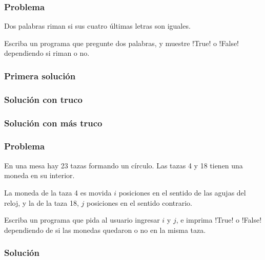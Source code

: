 \documentclass[12pt]{beamer}
\begin{document}
  \begin{frame}
    \label{problema-rimas}
    \frametitle{Problema}
    Dos palabras riman si sus cuatro últimas letras son iguales.

    Escriba un programa que pregunte dos palabras,
    y muestre \li!True! o \li!False! dependiendo si riman o no.

    
    
  \end{frame}

  \begin{frame}
    \label{rima1}
    \frametitle{Primera solución}
    
  \end{frame}

  \begin{frame}
    \label{rima1}
    \frametitle{Solución con truco}
    
  \end{frame}

  \begin{frame}
    \label{rima1}
    \frametitle{Solución con más truco}
    
  \end{frame}

  \begin{frame}
    \label{problema-tazas}
    \frametitle{Problema}
    En una mesa hay 23 tazas formando un círculo.
    Las tazas 4 y 18 tienen una moneda en su interior.

    La moneda de la taza 4 es movida
    \(i\) posiciones en el sentido de las agujas del reloj,
    y la de la taza 18, \(j\) posiciones en el sentido contrario.

    Escriba un programa que pida al usuario ingresar \(i\) y \(j\),
    e imprima \li!True! o \li!False! dependiendo de si las monedas
    quedaron o no en la misma taza.

    
  \end{frame}

  \begin{frame}
    \label{diagrama-tazas}
    \begin{center}
    \end{center}
  \end{frame}

  \begin{frame}
    \label{tazas}
    \frametitle{Solución}
    
  \end{frame}
\end{document}
